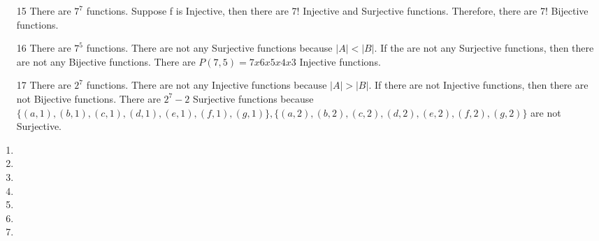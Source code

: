 \documentclass[12pt]{article}
\begin{document}
\begin{enumerate}
	\item [15] There are $7^7$ functions. Suppose f is Injective, then there are 7! Injective and Surjective functions. Therefore, there are 7! Bijective functions.
	\item [16] There are $7^5$ functions. There are not any Surjective functions because $|A| < |B|$. If the are not any Surjective functions, then there are not any Bijective functions. There are $P(7,5) = 7x6x5x4x3$ Injective functions.
	\item [17] There are $2^7$ functions. There are not any Injective functions because $|A| > |B|$. If there are not Injective functions, then there are not Bijective functions. There are $2^7 - 2$ Surjective functions because $\{(a,1), (b,1), (c,1), (d,1), (e,1), (f,1), (g,1)\}, \{(a,2), (b,2), (c,2), (d,2), (e,2), (f,2), (g,2)\}$ are not Surjective.
\end{enumerate}
\begin{enumerate}
	\item 
	\item 
	\item 
	\item 
	\item 
	\item 
	\item 
\end{enumerate}
\end{document}
